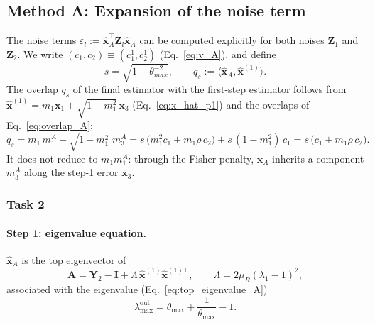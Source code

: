 \subsection{Method A: Expansion of the noise term}\label{an:A_full_Loss}

The noise terms $\varepsilon_l := \hat{\boldsymbol{x}}_A^\top \mathbf{Z}_l \hat{\boldsymbol{x}}_A$ can be computed explicitly
for both noises $\mathbf{Z}_1$ and $\mathbf{Z}_2$. We write
$(c_1, c_2) \equiv (c_1^1, c_2^1)$ (Eq.~\eqref{eq:v_A}), and define
\begin{equation}
  s = \sqrt{1-\theta_{max}^{-2}},
  \qquad
  q_s := \langle \hat{\boldsymbol{x}}_A, \hat{\boldsymbol{x}}^{(1)}\rangle .
\end{equation}
The overlap $q_s$ of the final estimator with the first-step estimator follows from
$\hat{\boldsymbol{x}}^{(1)} = m_1\boldsymbol{x}_1 + \sqrt{1-m_1^2}\,\boldsymbol{x}_3$ (Eq.~\eqref{eq:x_hat_p1}) and the overlaps of Eq.~\eqref{eq:overlap_A}:
\begin{equation}
  q_s = m_1\, m_1^A + \sqrt{1-m_1^2}\; m_3^A
      = s\,\big(m_1^2 c_1 + m_1\rho\, c_2\big) + s\,(1-m_1^2)\, c_1
      = s\,\big(c_1 + m_1\rho\, c_2\big).
  \label{eq:qs}
\end{equation}
It does not reduce to $m_1 m_1^A$: through the Fisher penalty, $\hat{\boldsymbol{x}}_A$ inherits a component $m_3^A$
along the step-1 error $\boldsymbol{x}_3$.

\subsubsection{Task 2}

\paragraph{Step 1: eigenvalue equation.}
$\hat{\boldsymbol{x}}_A$ is the top eigenvector of
\begin{equation}
  \mathbf{A} = \mathbf{Y}_2 - \mathbf{I} + \Lambda\, \hat{\boldsymbol{x}}^{(1)}\hat{\boldsymbol{x}}^{(1)\top} ,
  \qquad
  \Lambda = 2\mu_R(\lambda_1-1)^2 ,
\end{equation}
associated with the eigenvalue (Eq.~\eqref{eq:top_eigenvalue_A})
\begin{equation}
  \lambda^{\mathrm{out}}_{\max} = \theta_{\max} + \frac{1}{\theta_{\max}} - 1 .
\end{equation}

